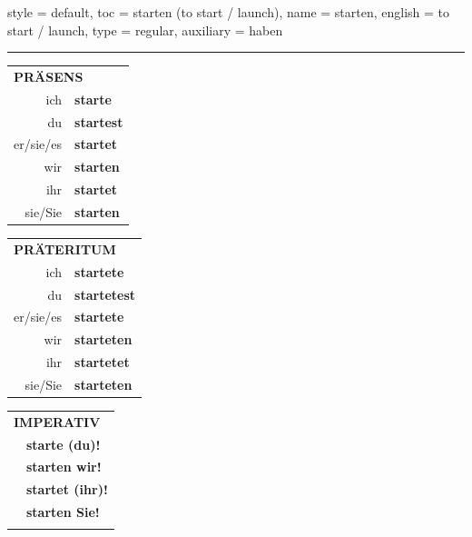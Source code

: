 \begin{verbentry}{
  style = {default},
  toc = {starten (to start / launch)},
  name = {starten},
  english = {to start / launch},
  type = {regular},
  auxiliary = {haben}
}
 
    
     \vspace{5pt}

    \hrule
    
    \vspace{5pt}

  \begin{tabular}{rl}
     \multicolumn{2}{l}{\textbf{PRÄSENS} }\\
    ich & \textbf{starte}\\
    du & \textbf{startest}\\
    er/sie/es & \textbf{startet}\\
    wir & \textbf{starten}\\
    ihr & \textbf{startet}\\
    sie/Sie & \textbf{starten}\\
  \end{tabular}
  \hfill
  \begin{tabular}{rl}
    \multicolumn{2}{l}{\textbf{PRÄTERITUM} }\\
    ich & \textbf{startete}\\
    du & \textbf{startetest}\\
    er/sie/es & \textbf{startete}\\
    wir & \textbf{starteten}\\
    ihr & \textbf{startetet}\\
    sie/Sie & \textbf{starteten}\\
  \end{tabular}
  \hfill
  \begin{tabular}{rl}
     \multicolumn{2}{l}{\textbf{IMPERATIV} }\\
   & \textbf{starte (du)!}\\
   & \textbf{starten wir!}\\
   & \textbf{startet (ihr)!}\\
   & \textbf{starten Sie!}\\
   & \vspace{10pt}
  \end{tabular}

 \vspace{10pt}


\end{verbentry}
